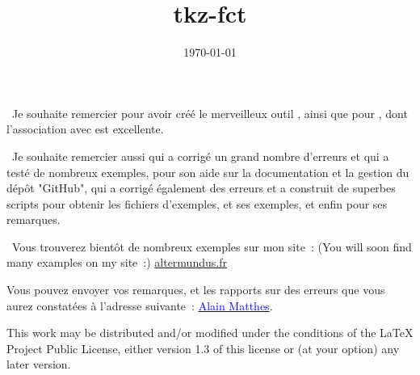 \documentclass[DIV         = 14,
               fontsize    = 10,
               index       = totoc,
               twoside,
               headings    = small
               ]{tkz-doc}
\gdef\tkznameofpack{tkz-fct}
\begin{document}
\title{\tkznameofpack}
\date{\today}
\clearpage
\thispagestyle{empty}
\maketitle 

\clearpage

\nameoffile{\tkznameofpack} 


\presentation

\vspace*{24pt}  
\noindent\lefthand\ Je souhaite remercier  pour avoir créé le merveilleux outil \tkzname{\TIKZ}, ainsi que  pour , dont l'association avec  est excellente.

   
\vspace*{12pt}
\noindent\lefthand\ Je souhaite remercier aussi   qui a corrigé un grand nombre d'erreurs et qui a testé de nombreux exemples,  pour son aide sur la documentation et la gestion du dépôt "GitHub",  qui a corrigé également des erreurs et a construit de superbes scripts pour obtenir les fichiers d'exemples,    et ses exemples, et enfin   pour ses remarques. 


\vspace*{12pt}
\noindent\lefthand\ Vous trouverez bientôt de nombreux exemples sur mon site~: (You will soon find many examples on my site~:)
\href{http://altermundus.fr}{altermundus.fr}  

\vfill   
Vous pouvez envoyer vos remarques, et les rapports sur des erreurs que vous aurez constatées à l'adresse suivante~: \href{mailto:al.ma@mac.com}{\textcolor{blue}{Alain Matthes}}.
 
This work may be distributed and/or modified under the
conditions of the LaTeX Project Public License, either version 1.3
of this license or (at your option) any later version.
\end{document}
